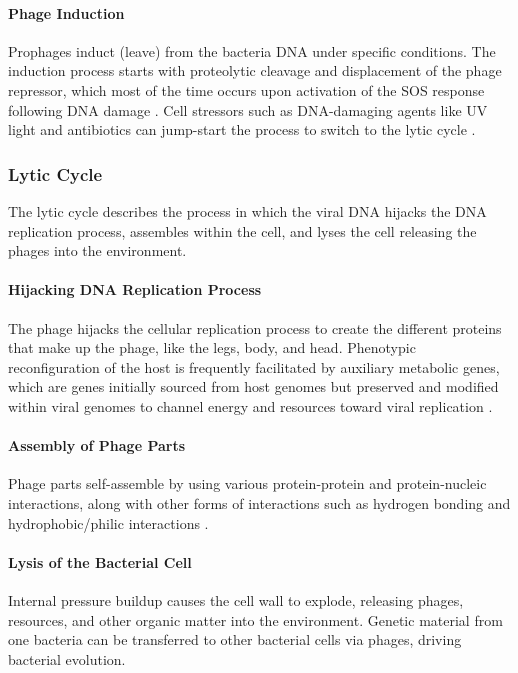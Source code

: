 \paragraph{Phage Induction}
Prophages induct (leave) from the bacteria DNA under specific conditions. 
The induction process starts with proteolytic cleavage and displacement of the phage repressor, which most of the time occurs upon activation of the SOS response following DNA damage \cite{waldorPhageRegulatoryCircuits2005}. 
Cell stressors such as DNA-damaging agents like UV light and antibiotics can jump-start the process to switch to the lytic cycle \cite{stoneUnderstandingExploitingPhage2019, fortierImportanceProphagesEvolution2013}. 

\subsubsection{Lytic Cycle}
The lytic cycle describes the process in which the viral DNA hijacks the DNA replication process, assembles within the cell, and lyses the cell releasing the phages into the environment. 
\paragraph{Hijacking DNA Replication Process}
The phage hijacks the cellular replication process to create the different proteins that make up the phage, like the legs, body, and head. 
Phenotypic reconfiguration of the host is frequently facilitated by auxiliary metabolic genes, which are genes initially sourced from host genomes but preserved and modified within viral genomes to channel energy and resources toward viral replication \cite{warwick-dugdaleHosthijackingPlanktonicPiracy2019}. 
\paragraph{Assembly of Phage Parts}
Phage parts self-assemble by using various protein-protein and protein-nucleic interactions, along with other forms of interactions such as hydrogen bonding and hydrophobic/philic interactions \cite{aksyukBacteriophageAssembly2011}. 
\paragraph{Lysis of the Bacterial Cell}
Internal pressure buildup causes the cell wall to explode, releasing phages, resources, and other organic matter into the environment. 
Genetic material from one bacteria can be transferred to other bacterial cells via phages, driving bacterial evolution. 


